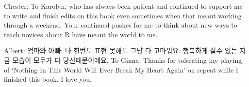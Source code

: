 \cleardoublepage\newpage
\thispagestyle{empty}

\begin{center}
Chester: To Karolyn, who has always been patient and continued to support me to write and finish edits on this book even sometimes when that meant working through a weekend.  Your continued pushes for me to think about new ways to teach novices about R have meant the world to me.

\vspace{0.3in}

Albert: 엄마와 아빠: 나 한번도 표현 못해도 그냥 다 고마워요. 행복하게 살수 있는 지금 모습이 모두가 다 당신때문이예요. To Ginna: Thanks for tolerating my playing of `Nothing In This World Will Ever Break My Heart Again' on repeat while I finished this book. I love you.
\end{center}

\setlength{\abovedisplayskip}{-5pt}
\setlength{\abovedisplayshortskip}{-5pt}
